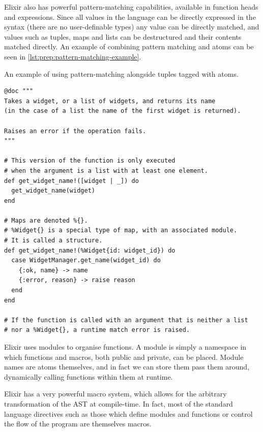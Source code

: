Elixir also has powerful pattern-matching capabilities, available in function heads and  expressions.
Since all values in the language can be directly expressed in the syntax (there are no user-definable types) any value can be directly matched, and values such as tuples, maps and lists can be destructured and their contents matched directly.
An example of combining pattern matching and atoms can be seen in \cref{lst:prep:pattern-matching-example}.

\begin{listing}[h]
	\caption{An example of using pattern-matching alongside tuples tagged with atoms.}
	\label{lst:prep:pattern-matching-example}
	\begin{verbatim}
@doc """
Takes a widget, or a list of widgets, and returns its name
(in the case of a list the name of the first widget is returned).

Raises an error if the operation fails. 
"""

# This version of the function is only executed
# when the argument is a list with at least one element.
def get_widget_name!([widget | _]) do
  get_widget_name(widget)
end

# Maps are denoted %{}.
# %Widget{} is a special type of map, with an associated module.
# It is called a structure.
def get_widget_name!(%Widget{id: widget_id}) do
  case WidgetManager.get_name(widget_id) do
    {:ok, name} -> name
    {:error, reason} -> raise reason
  end
end

# If the function is called with an argument that is neither a list
# nor a %Widget{}, a runtime match error is raised.
	\end{verbatim}
\end{listing}


Elixir uses modules to organise functions.
A module is simply a namespace in which functions and macros, both public and private, can be placed.
Module names are atoms themselves, and in fact we can store them pass them around, dynamically calling functions within them at runtime.

Elixir has a very powerful macro system, which allows for the arbitrary transformation of the AST at compile-time.
In fact, most of the standard language directives such as those which define modules and functions or control the flow of the program are themselves macros.

